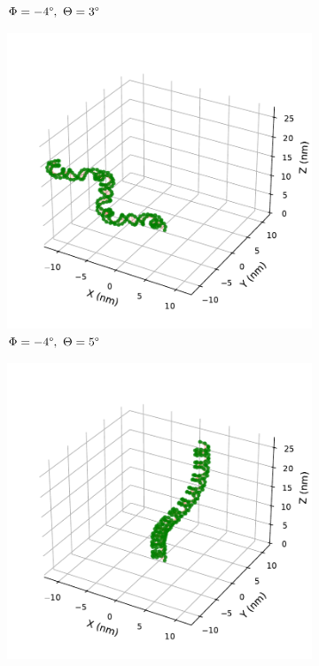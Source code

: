 \documentclass[a4paper,10pt]{article}
\begin{document}
\begin{figure}[tb]
\begin{subfigure}{0.3\textwidth}
\caption{$\Phi=-4\degree,\ \Theta=3\degree$}
\label{fig:bend_b}
\end{subfigure}
\begin{subfigure}{0.3\textwidth}
\includegraphics[width=\textwidth]{bw_-4_5.pdf}
\caption{$\Phi=-4\degree,\ \Theta=5\degree$}
\label{fig:bend_c}
\end{subfigure}
\begin{subfigure}{0.3\textwidth}
\includegraphics[width=\textwidth]{bw_4_1.pdf}

\end{subfigure}
\end{figure}
\end{document}
